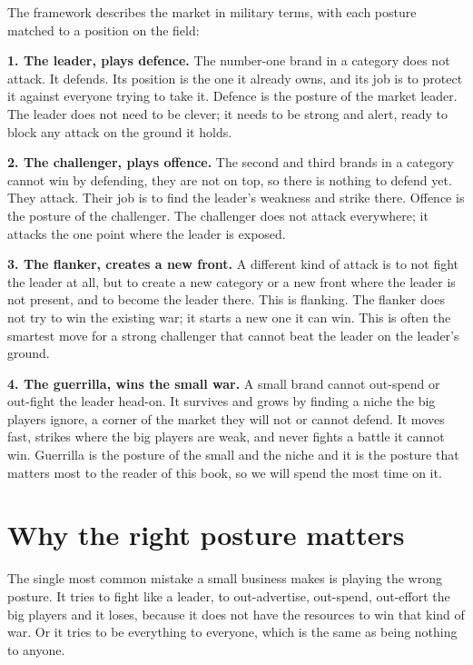 \documentclass[10pt,twoside,openany]{memoir}
\newcommand{\needspacehead}{\needspace{4\baselineskip}}
\let\oldsection\section
\renewcommand{\section}{\needspacehead\oldsection}
\begin{document}
{The framework describes the market in military terms, with each posture
matched to a position on the field:

\textbf{1. The leader, plays defence.} The number-one brand in a
category does not attack. It defends. Its position is the one it already
owns, and its job is to protect it against everyone trying to take it.
Defence is the posture of the market leader. The leader does not need to
be clever; it needs to be strong and alert, ready to block any attack on
the ground it holds.

\textbf{2. The challenger, plays offence.} The second and third brands
in a category cannot win by defending, they are not on top, so there is
nothing to defend yet. They attack. Their job is to find the leader's
weakness and strike there. Offence is the posture of the challenger. The
challenger does not attack everywhere; it attacks the one point where
the leader is exposed.

\textbf{3. The flanker, creates a new front.} A different kind of attack
is to not fight the leader at all, but to create a new category or a new
front where the leader is not present, and to become the leader there.
This is flanking. The flanker does not try to win the existing war; it
starts a new one it can win. This is often the smartest move for a
strong challenger that cannot beat the leader on the leader's ground.

\textbf{4. The guerrilla, wins the small war.} A small brand cannot
out-spend or out-fight the leader head-on. It survives and grows by
finding a niche the big players ignore, a corner of the market they will
not or cannot defend. It moves fast, strikes where the big players are
weak, and never fights a battle it cannot win. Guerrilla is the posture
of the small and the niche and it is the posture that matters most to
the reader of this book, so we will spend the most time on it.

\section{Why the right posture
matters}\label{why-the-right-posture-matters}

The single most common mistake a small business makes is playing the
wrong posture. It tries to fight like a leader, to out-advertise,
out-spend, out-effort the big players and it loses, because it does not
have the resources to win that kind of war. Or it tries to be everything
to everyone, which is the same as being nothing to anyone.

}
\end{document}
